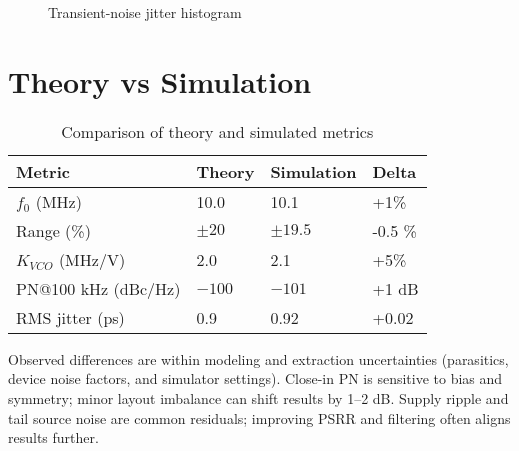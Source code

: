 \begin{figure}[H]
  \centering
  \caption{Transient-noise jitter histogram}
\end{figure}

\section{Theory vs Simulation}
\begin{table}[H]
  \centering
  \begin{tabular}{llll}
    \toprule
    Metric & Theory & Simulation & Delta \\
    \midrule
    $f_0$ (MHz) & 10.0 & 10.1 & +1\% \\
    Range (\%) & $\pm20$ & $\pm19.5$ & -0.5 \% \\
    $K_{VCO}$ (MHz/V) & 2.0 & 2.1 & +5\% \\
    PN@100 kHz (dBc/Hz) & $-100$ & $-101$ & +1 dB \\
    RMS jitter (ps) & 0.9 & 0.92 & +0.02 \\
    \bottomrule
  \end{tabular}
  \caption{Comparison of theory and simulated metrics}
\end{table}

Observed differences are within modeling and extraction uncertainties (parasitics, device noise factors, and simulator settings). Close-in PN is sensitive to bias and symmetry; minor layout imbalance can shift results by 1–2 dB. Supply ripple and tail source noise are common residuals; improving PSRR and filtering often aligns results further.


